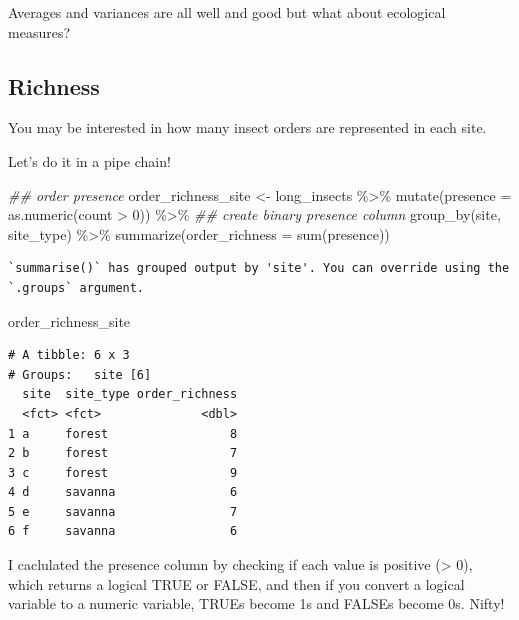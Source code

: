 \documentclass[
  letterpaper,
  DIV=11,
  numbers=noendperiod]{scrreprt}
\newenvironment{Shaded}{\begin{snugshade}}{\end{snugshade}}
\newcommand{\AttributeTok}[1]{\textcolor[rgb]{0.40,0.45,0.13}{#1}}
\newcommand{\DecValTok}[1]{\textcolor[rgb]{0.68,0.00,0.00}{#1}}
\newcommand{\DocumentationTok}[1]{\textcolor[rgb]{0.37,0.37,0.37}{\textit{#1}}}
\newcommand{\FunctionTok}[1]{\textcolor[rgb]{0.28,0.35,0.67}{#1}}
\newcommand{\NormalTok}[1]{\textcolor[rgb]{0.00,0.23,0.31}{#1}}
\newcommand{\OtherTok}[1]{\textcolor[rgb]{0.00,0.23,0.31}{#1}}
\newcommand{\SpecialCharTok}[1]{\textcolor[rgb]{0.37,0.37,0.37}{#1}}
\begin{document}
Averages and variances are all well and good but what about ecological
measures?

\hypertarget{richness}{%
\subsection{Richness}\label{richness}}

You may be interested in how many insect orders are represented in each
site.

Let's do it in a pipe chain!

\begin{Shaded}
\begin{Highlighting}[]
\DocumentationTok{\#\# order presence}
\NormalTok{order\_richness\_site }\OtherTok{\textless{}{-}}\NormalTok{ long\_insects }\SpecialCharTok{\%\textgreater{}\%} 
  \FunctionTok{mutate}\NormalTok{(}\AttributeTok{presence =} \FunctionTok{as.numeric}\NormalTok{(count }\SpecialCharTok{\textgreater{}} \DecValTok{0}\NormalTok{)) }\SpecialCharTok{\%\textgreater{}\%} \DocumentationTok{\#\# create binary presence column}
  \FunctionTok{group\_by}\NormalTok{(site, site\_type) }\SpecialCharTok{\%\textgreater{}\%}
  \FunctionTok{summarize}\NormalTok{(}\AttributeTok{order\_richness =} \FunctionTok{sum}\NormalTok{(presence))}
\end{Highlighting}
\end{Shaded}

\begin{verbatim}
`summarise()` has grouped output by 'site'. You can override using the
`.groups` argument.
\end{verbatim}

\begin{Shaded}
\begin{Highlighting}[]
\NormalTok{order\_richness\_site}
\end{Highlighting}
\end{Shaded}

\begin{verbatim}
# A tibble: 6 x 3
# Groups:   site [6]
  site  site_type order_richness
  <fct> <fct>              <dbl>
1 a     forest                 8
2 b     forest                 7
3 c     forest                 9
4 d     savanna                6
5 e     savanna                7
6 f     savanna                6
\end{verbatim}

I caclulated the presence column by checking if each value is positive
(\textgreater{} 0), which returns a logical TRUE or FALSE, and then if
you convert a logical variable to a numeric variable, TRUEs become 1s
and FALSEs become 0s. Nifty!
\end{document}
